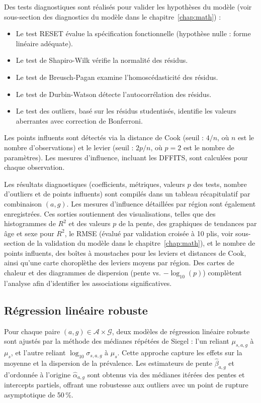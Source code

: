 Des tests diagnostiques sont réalisés pour valider les hypothèses du modèle (voir sous-section des diagnostics du modèle dans le chapitre~\ref{chap:math}) :
\begin{itemize}
	\item Le test RESET évalue la spécification fonctionnelle (hypothèse nulle : forme linéaire adéquate).
	\item Le test de Shapiro-Wilk vérifie la normalité des résidus.
	\item Le test de Breusch-Pagan examine l'homoscédasticité des résidus.
	\item Le test de Durbin-Watson détecte l'autocorrélation des résidus.
	\item Le test des outliers, basé sur les résidus studentisés, identifie les valeurs aberrantes avec correction de Bonferroni.
\end{itemize}
Les points influents sont détectés via la distance de Cook (seuil : $4 / n$, où $n$ est le nombre d'observations) et le levier (seuil : $2p / n$, où $p = 2$ est le nombre de paramètres). Les mesures d'influence, incluant les DFFITS, sont calculées pour chaque observation.

Les résultats diagnostiques (coefficients, métriques, valeurs $p$ des tests, nombre d'outliers et de points influents) sont compilés dans un tableau récapitulatif par combinaison $(a, g)$. Les mesures d'influence détaillées par région sont également enregistrées. Ces sorties soutiennent des visualisations, telles que des histogrammes de $R^2$ et des valeurs $p$ de la pente, des graphiques de tendances par âge et sexe pour $R^2$, le RMSE (évalué par validation croisée à 10 plis, voir sous-section de la validation du modèle dans le chapitre~\ref{chap:math}), et le nombre de points influents, des boîtes à moustaches pour les leviers et distances de Cook, ainsi qu'une carte choroplèthe des leviers moyens par région. Des cartes de chaleur et des diagrammes de dispersion (pente vs. $-\log_{10}(p)$) complètent l'analyse afin d'identifier les associations significatives.

\subsection{Régression linéaire robuste}
Pour chaque paire $(a, g) \in \mathcal{A} \times \mathcal{G}$, deux modèles de régression linéaire robuste sont ajustés par la méthode des médianes répétées de Siegel : l'un reliant $\mu_{s,a,g}$ à $\mu_s$, et l'autre reliant $\log_{10} \sigma_{s,a,g}$ à $\mu_s$. Cette approche capture les effets sur la moyenne et la dispersion de la prévalence. Les estimateurs de pente $\hat{\beta}_{a,g}$ et d'ordonnée à l'origine $\hat{\alpha}_{a,g}$ sont obtenus via des médianes itérées des pentes et intercepts partiels, offrant une robustesse aux outliers avec un point de rupture asymptotique de 50\,\%.

